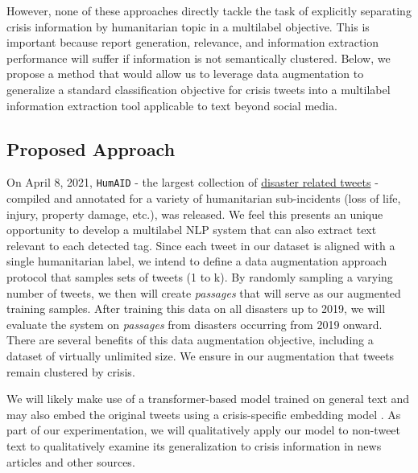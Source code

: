 \documentclass[11pt,a4paper]{article}
\begin{document}
However, none of these approaches directly tackle the task of explicitly separating crisis information by humanitarian topic in a multilabel objective. This is important because report generation, relevance, and information extraction performance will suffer if information is not semantically clustered. Below, we propose a method that would allow us to leverage data augmentation to generalize a standard classification objective for crisis tweets into a multilabel information extraction tool applicable to text beyond social media.

\subsection{Proposed Approach}
On April 8, 2021, \texttt{HumAID} \cite{humaid2020} - the largest collection of \href{https://crisisnlp.qcri.org/humaid_dataset}{disaster related tweets} - compiled and annotated for a variety of humanitarian sub-incidents (loss of life, injury, property damage, etc.), was released. We feel this presents an unique opportunity to develop a multilabel NLP system that can also extract text relevant to each detected tag. Since each tweet in our dataset is aligned with a single humanitarian label, we intend to define a data augmentation approach protocol that samples sets of tweets (1 to k). By randomly sampling a varying number of tweets, we then will create \textit{passages} that will serve as our augmented training samples. After training this data on all disasters up to 2019, we will evaluate the system on \textit{passages} from disasters occurring from 2019 onward. There are several benefits of this data augmentation objective, including a dataset of virtually unlimited size. We ensure in our augmentation that tweets remain clustered by crisis.


We will likely make use of a transformer-based model trained on general text and may also embed the original tweets using a crisis-specific embedding model \cite{nguyen2017robust}. As part of our experimentation, we will qualitatively apply our model to non-tweet text to qualitatively examine its generalization to crisis information in news articles and other sources.
\end{document}
